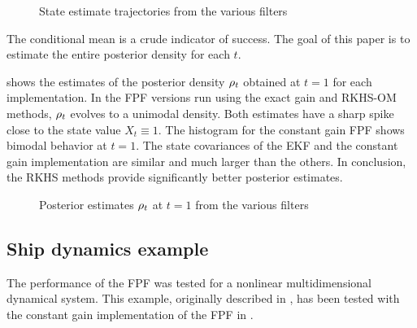 \begin{figure}[h]
	\centering
	\caption{ State estimate trajectories from the various filters}
	\label{steady_state_estimate}
\end{figure}

The conditional mean is a crude indicator of success. The goal of this paper is to estimate the entire posterior density for each $t$.

 shows the estimates of the posterior density $\rho_t$ obtained at $t=1$ for each implementation.  In the FPF versions run using the exact gain and RKHS-OM methods, $\rho_t$ evolves to a unimodal density. Both estimates have a sharp spike close to the state value $X_t \equiv 1$. The histogram for the constant gain FPF shows bimodal behavior at $t=1$.  The state covariances of the EKF and the constant gain implementation are similar and much larger than the others. In conclusion, the RKHS methods provide   significantly better posterior estimates.

\begin{figure}[ht]
	\centering
	\caption {Posterior estimates $\rho_t$ at $t=1$ from the various filters}
	\label{histogram_state_estimate}
\end{figure}

\subsection{Ship dynamics example}
The performance of the FPF was tested for a nonlinear multidimensional dynamical system. This example, originally described in \cite{budchelee07}, has been tested with the constant gain implementation of the FPF in \cite{tilghiomeh13}.

